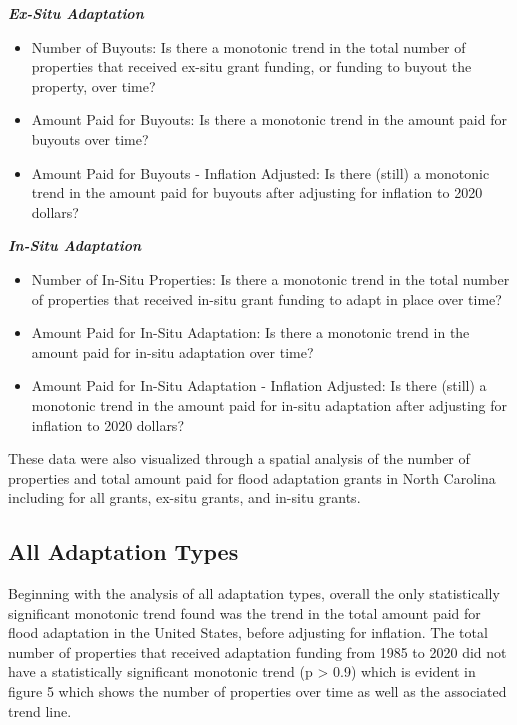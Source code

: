 \documentclass[
  12pt,
]{article}
\begin{document}
\textbf{\emph{Ex-Situ Adaptation}}

\begin{itemize}
\item
  Number of Buyouts: Is there a monotonic trend in the total number of
  properties that received ex-situ grant funding, or funding to buyout
  the property, over time?
\item
  Amount Paid for Buyouts: Is there a monotonic trend in the amount paid
  for buyouts over time?
\item
  Amount Paid for Buyouts - Inflation Adjusted: Is there (still) a
  monotonic trend in the amount paid for buyouts after adjusting for
  inflation to 2020 dollars?
\end{itemize}

\textbf{\emph{In-Situ Adaptation}}

\begin{itemize}
\item
  Number of In-Situ Properties: Is there a monotonic trend in the total
  number of properties that received in-situ grant funding to adapt in
  place over time?
\item
  Amount Paid for In-Situ Adaptation: Is there a monotonic trend in the
  amount paid for in-situ adaptation over time?
\item
  Amount Paid for In-Situ Adaptation - Inflation Adjusted: Is there
  (still) a monotonic trend in the amount paid for in-situ adaptation
  after adjusting for inflation to 2020 dollars?
\end{itemize}

These data were also visualized through a spatial analysis of the number
of properties and total amount paid for flood adaptation grants in North
Carolina including for all grants, ex-situ grants, and in-situ grants.

\hypertarget{all-adaptation-types}{%
\subsection{All Adaptation Types}\label{all-adaptation-types}}

Beginning with the analysis of all adaptation types, overall the only
statistically significant monotonic trend found was the trend in the
total amount paid for flood adaptation in the United States, before
adjusting for inflation. The total number of properties that received
adaptation funding from 1985 to 2020 did not have a statistically
significant monotonic trend (p \textgreater{} 0.9) which is evident in
figure 5 which shows the number of properties over time as well as the
associated trend line.
\end{document}
